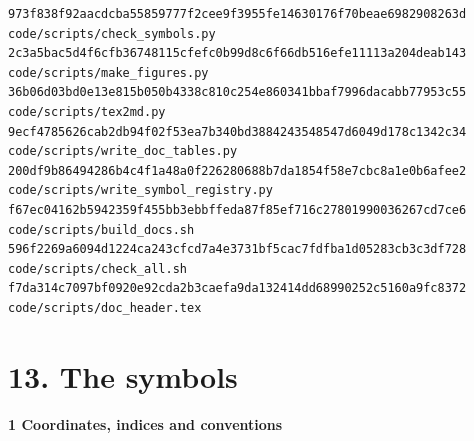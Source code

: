 \documentclass[
  10pt,
]{article}
\begin{document}
\begin{verbatim}
973f838f92aacdcba55859777f2cee9f3955fe14630176f70beae6982908263d  code/scripts/check_symbols.py
2c3a5bac5d4f6cfb36748115cfefc0b99d8c6f66db516efe11113a204deab143  code/scripts/make_figures.py
36b06d03bd0e13e815b050b4338c810c254e860341bbaf7996dacabb77953c55  code/scripts/tex2md.py
9ecf4785626cab2db94f02f53ea7b340bd3884243548547d6049d178c1342c34  code/scripts/write_doc_tables.py
200df9b86494286b4c4f1a48a0f226280688b7da1854f58e7cbc8a1e0b6afee2  code/scripts/write_symbol_registry.py
f67ec04162b5942359f455bb3ebbffeda87f85ef716c27801990036267cd7ce6  code/scripts/build_docs.sh
596f2269a6094d1224ca243cfcd7a4e3731bf5cac7fdfba1d05283cb3c3df728  code/scripts/check_all.sh
f7da314c7097bf0920e92cda2b3caefa9da132414dd68990252c5160a9fc8372  code/scripts/doc_header.tex
\end{verbatim}

\hypertarget{the-symbols}{%
\section{13. The symbols}\label{the-symbols}}

\textbf{1 Coordinates, indices and conventions}
\end{document}
